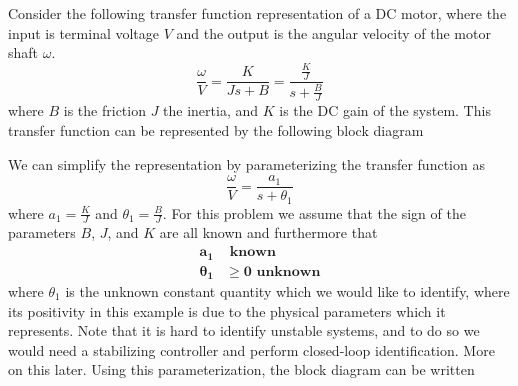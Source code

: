 \begin{example}\label{example.adaptive.dcmotor_singleparam_error3}
  Consider the following transfer function representation of a DC motor, where the input is terminal voltage $V$ and the output is the angular velocity of the motor shaft $\omega$.
  \begin{equation*}
    \frac{\omega}{V}=\frac{K}{Js+B}=\frac{\frac{K}{J}}{s+\frac{B}{J}}
  \end{equation*}
  where $B$ is the friction $J$ the inertia, and $K$ is the DC gain of the system.
  This transfer function can be represented by the following block diagram
  \begin{center}
  \end{center}
  We can simplify the representation by parameterizing the transfer function as
  \begin{equation*}
    \frac{\omega}{V}=\frac{a_{1}}{s+\theta_{1}}
  \end{equation*}
  where $a_{1}=\frac{K}{J}$ and $\theta_{1}=\frac{B}{J}$.
  For this problem we assume that the sign of the parameters $B$, $J$, and $K$ are all known and furthermore that
  \begin{align*}
    \boldsymbol{a_{1}}&\textbf{~known} \\
    \boldsymbol{\theta_{1}}&\boldsymbol{\geq0}\textbf{~unknown}
  \end{align*}
  where $\theta_{1}$ is the unknown constant quantity which we would like to identify, where its positivity in this example is due to the physical parameters which it represents.
  Note that it is hard to identify unstable systems, and to do so we would need a stabilizing controller and perform closed-loop identification.
  More on this later.
  Using this parameterization, the block diagram can be written
  \begin{center}
    \begin{tikzpicture}[auto, scale=0.9, every node/.style={transform shape}, node distance=1.0cm, >=latex']

\end{tikzpicture}
\end{center}
\end{example}

